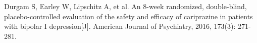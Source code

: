\documentclass[supercite]{Experimental_Report}
\theoremstyle{definition}
\begin{document}
\begin{thebibliography}{99}  

  Durgam S, Earley W, Lipschitz A, et al. An 8-week randomized, double-blind, placebo-controlled evaluation of the safety and efficacy of cariprazine in patients with bipolar I depression[J]. American Journal of Psychiatry, 2016, 173(3): 271-281.
  
  \end{thebibliography}
\clearpage

\end{document}

